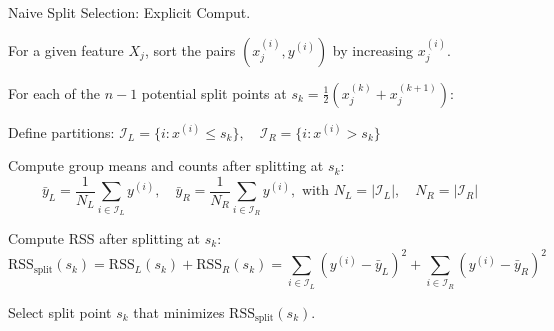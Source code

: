 \documentclass[10pt,compress,t,notes=noshow, xcolor=table]{beamer}
\begin{document}
\begin{framev}[align=top]{Naive Split Selection: Explicit Comput.}
\begin{itemizeM}
\item For a given feature $X_j$, sort the pairs $(x_j^{(i)}, y^{(i)})$ by increasing $x_j^{(i)}$.
\item For each of the $n - 1$ potential split points at $s_k = \frac{1}{2}(x_j^{(k)} + x_j^{(k+1)})$:
\begin{itemizeS}
\item Define partitions: $\mathcal{I}_L = \{ i : x^{(i)} \leq s_k \}, \quad \mathcal{I}_R = \{ i : x^{(i)} > s_k \}$
\item Compute group means and counts after splitting at $s_k$:
$$
\textstyle
\bar{y}_L = \frac{1}{N_L} \sum_{i \in \mathcal{I}_L} y^{(i)}, \quad
\bar{y}_R = \frac{1}{N_R} \sum_{i \in \mathcal{I}_R} y^{(i)}, \text{ with } N_L = |\mathcal{I}_L|, \quad N_R = |\mathcal{I}_R|
$$
\item Compute RSS after splitting at $s_k$:
$$
\textstyle
\text{RSS}_\text{split}(s_k) = \text{RSS}_L(s_k) + \text{RSS}_R(s_k) = \sum_{i \in \mathcal{I}_L} (y^{(i)} - \bar{y}_L)^2 + \sum_{i \in \mathcal{I}_R} (y^{(i)} - \bar{y}_R)^2
$$
\end{itemizeS}
\item Select split point $s_k$ that minimizes $\text{RSS}_\text{split}(s_k)$.

\end{itemizeM}
\end{framev}
\end{document}
